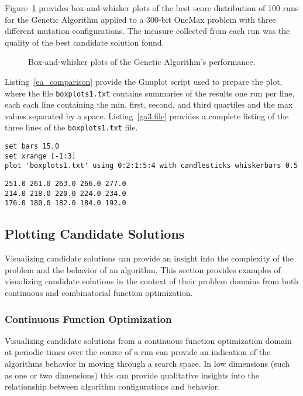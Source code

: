 Figure~\ref{plot:ga3} provides box-and-whisker plots of the best score distribution of 100 runs for the Genetic Algorithm applied to a 300-bit OneMax problem with three different mutation configurations. The measure collected from each run was the quality of the best candidate solution found.

\begin{figure}[htp]
\centering

\caption{Box-and-whisker plots of the Genetic Algorithm's performance.}
\label{plot:ga3}
\end{figure}

Listing~\ref{ea_comparison} provide the Gnuplot script used to prepare the plot, where the file \texttt{boxplots1.txt} contains summaries of the results one run per line, each each line containing the min, first, second, and third quartiles and the max values separated by a space. Listing~\ref{ga3.file} provides a complete listing of the three lines of the \texttt{boxplots1.txt} file.

\begin{lstlisting}[caption=Gnuplot script for creating a Box-and-whisker plot., label=ea_comparison]
set bars 15.0
set xrange [-1:3]
plot 'boxplots1.txt' using 0:2:1:5:4 with candlesticks whiskerbars 0.5
\end{lstlisting}

\begin{lstlisting}[caption=Complete listing of the \texttt{boxplots1.txt} file., label=ga3.file]
251.0 261.0 263.0 266.0 277.0
214.0 218.0 220.0 224.0 234.0
176.0 180.0 182.0 184.0 192.0
\end{lstlisting}

%
%
\subsection{Plotting Candidate Solutions}
Visualizing candidate solutions can provide an insight into the complexity of the problem and the behavior of an algorithm.  This section provides examples of visualizing candidate solutions in the context of their problem domains from both continuous and combinatorial function optimization.

\subsubsection{Continuous Function Optimization}
Visualizing candidate solutions from a continuous function optimization domain at periodic times over the course of a run can provide an indication of the algorithms behavior in moving through a search space. In low dimensions (such as one or two dimensions) this can provide qualitative insights into the relationship between algorithm configurations and behavior.


